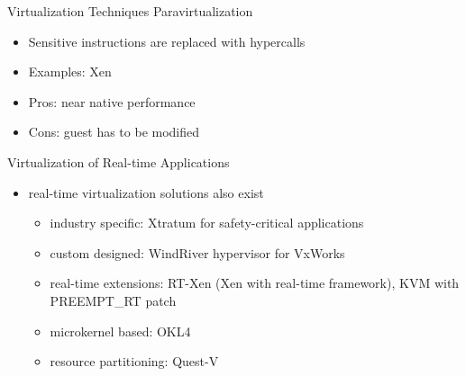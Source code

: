 \documentclass[10pt,hyperref={hyperfootnotes=false}, xcolor={usenames, dvipsnames}]{beamer}
\begin{document}
\begin{frame}{Virtualization Techniques} {Paravirtualization}
  \begin{itemize}
  \item {Sensitive instructions are replaced with hypercalls \pause{}}  
	
	\pause{}
  \item{Examples: Xen} \pause{}
  \item{Pros: near native performance} \pause{}
  \item{Cons: guest has to be modified}

  \end{itemize}
\end{frame}

\begin{frame}{Virtualization of Real-time Applications}
  \begin{itemize}
  \item {real-time virtualization solutions also exist} \pause{}
 		\begin{itemize}
			\item{industry specific: Xtratum for safety-critical applications} \pause{}
			\item{custom designed: WindRiver hypervisor for VxWorks} \pause{}
			\item{real-time extensions: \pause{}RT-Xen (Xen with real-time framework), \pause{}KVM with PREEMPT\_RT patch} \pause{}
			\item{microkernel based: OKL4} \pause{}
			\item{resource partitioning: Quest-V}
		\end{itemize}  
  \end{itemize}
\end{frame}
\end{document}
